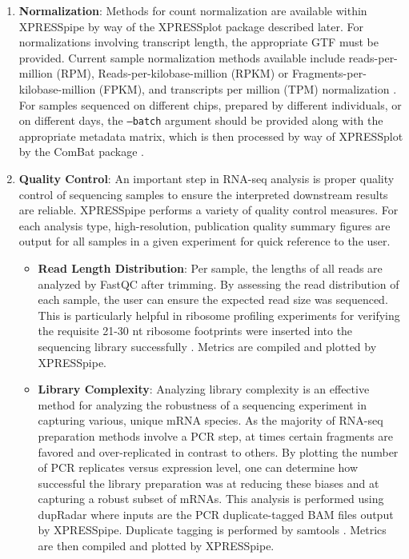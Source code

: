 \documentclass[11pt, a4paper, oneside]{article}
\begin{document}
\begin{enumerate}
  \item \textbf{Normalization}: Methods for count normalization are available within XPRESSpipe by way of the XPRESSplot package described later. For normalizations involving transcript length, the appropriate GTF must be provided. Current sample normalization methods available include reads-per-million (RPM), Reads-per-kilobase-million (RPKM) or Fragments-per-kilobase-million (FPKM), and transcripts per million (TPM) normalization \cite{evans_briefbio}. For samples sequenced on different chips, prepared by different individuals, or on different days, the \texttt{--batch} argument should be provided along with the appropriate metadata matrix, which is then processed by way of XPRESSplot by the ComBat package \cite{sva}.
  \item \textbf{Quality Control}:
  An important step in RNA-seq analysis is proper quality control of sequencing samples to ensure the interpreted downstream results are reliable. XPRESSpipe performs a variety of quality control measures. For each analysis type, high-resolution, publication quality summary figures are output for all samples in a given experiment for quick reference to the user.

    \begin{itemize}
      \item \textbf{Read Length Distribution}: Per sample, the lengths of all reads are analyzed by FastQC \cite{fastqc} after trimming. By assessing the read distribution of each sample, the user can ensure the expected read size was sequenced. This is particularly helpful in ribosome profiling experiments for verifying the requisite 21-30 nt ribosome footprints were inserted into the sequencing library successfully \cite{ingolia_meth}. Metrics are compiled and plotted by XPRESSpipe.

      \item \textbf{Library Complexity}: Analyzing library complexity is an effective method for analyzing the robustness of a sequencing experiment in capturing various, unique mRNA species. As the majority of RNA-seq preparation methods involve a PCR step, at times certain fragments are favored and over-replicated in contrast to others. By plotting the number of PCR replicates versus expression level, one can determine how successful the library preparation was at reducing these biases and at capturing a robust subset of mRNAs. This analysis is performed using dupRadar \cite{dupradar} where inputs are the PCR duplicate-tagged BAM files output by XPRESSpipe. Duplicate tagging is performed by samtools \cite{samtools}. Metrics are then compiled and plotted by XPRESSpipe.


\end{itemize}
\end{enumerate}
\end{document}
